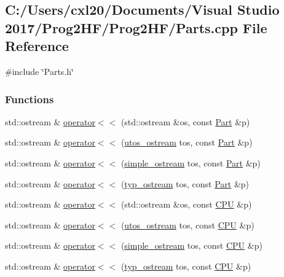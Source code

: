 \subsection{C\+:/\+Users/cxl20/\+Documents/\+Visual Studio 2017/\+Prog2\+H\+F/\+Prog2\+H\+F/\+Parts.cpp File Reference}
\label{_parts_8cpp}
{\ttfamily \#include \char`\"{}Parts.\+h\char`\"{}}\newline
\subsubsection*{Functions}
\begin{DoxyCompactItemize}
\item 
std\+::ostream \& \mbox{\hyperlink{_parts_8cpp_a545350ed97c61e94aefe4fff919dd749}{operator$<$$<$}} (std\+::ostream \&os, const \mbox{\hyperlink{class_part}{Part}} \&p)
\item 
std\+::ostream \& \mbox{\hyperlink{_parts_8cpp_adbf3d6a04840d73851e882509f7a9ac7}{operator$<$$<$}} (\mbox{\hyperlink{structutos__ostream}{utos\+\_\+ostream}} tos, const \mbox{\hyperlink{class_part}{Part}} \&p)
\item 
std\+::ostream \& \mbox{\hyperlink{_parts_8cpp_a784eb7a4c6561272bdbf1d4a46bfb356}{operator$<$$<$}} (\mbox{\hyperlink{structsimple__ostream}{simple\+\_\+ostream}} tos, const \mbox{\hyperlink{class_part}{Part}} \&p)
\item 
std\+::ostream \& \mbox{\hyperlink{_parts_8cpp_ab051324d8941e0574d0d62f8b48df95b}{operator$<$$<$}} (\mbox{\hyperlink{structtyp__ostream}{typ\+\_\+ostream}} tos, const \mbox{\hyperlink{class_part}{Part}} \&p)
\item 
std\+::ostream \& \mbox{\hyperlink{_parts_8cpp_a4e72844a8f5f9e999222fcd2ce889cc6}{operator$<$$<$}} (std\+::ostream \&os, const \mbox{\hyperlink{class_c_p_u}{C\+PU}} \&p)
\item 
std\+::ostream \& \mbox{\hyperlink{_parts_8cpp_a46ef2ba811c1130da70a422ffaaef5be}{operator$<$$<$}} (\mbox{\hyperlink{structutos__ostream}{utos\+\_\+ostream}} tos, const \mbox{\hyperlink{class_c_p_u}{C\+PU}} \&p)
\item 
std\+::ostream \& \mbox{\hyperlink{_parts_8cpp_afae6aeaab5e1ee70431ea76285d9f39a}{operator$<$$<$}} (\mbox{\hyperlink{structsimple__ostream}{simple\+\_\+ostream}} tos, const \mbox{\hyperlink{class_c_p_u}{C\+PU}} \&p)
\item 
std\+::ostream \& \mbox{\hyperlink{_parts_8cpp_a76b25a54fb0f747191591b3914d04097}{operator$<$$<$}} (\mbox{\hyperlink{structtyp__ostream}{typ\+\_\+ostream}} tos, const \mbox{\hyperlink{class_c_p_u}{C\+PU}} \&p)

\end{DoxyCompactItemize}

